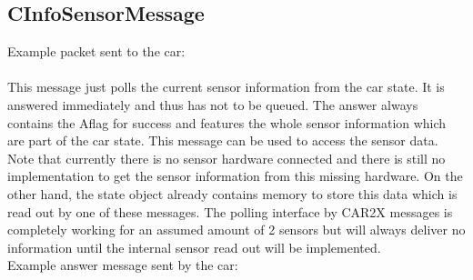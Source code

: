 \subsection*{CInfoSensorMessage}
Example packet sent to the car:\\
 \\
\newline
\newline
This message just polls the current sensor information from the car state. It is answered immediately and thus has not to be queued. The answer always contains the \glqq A\grqq flag for success and features the whole sensor information which are part of the car state. This message can be used to access the sensor data. Note that currently there is no sensor hardware connected and there is still no implementation to get the sensor information from this missing hardware. On the other hand, the state object already contains memory to store this data which is read out by one of these messages. The polling interface by CAR2X messages is completely working for an assumed amount of 2 sensors but will always deliver no information until the internal sensor read out will be implemented.\\
\newline
Example answer message sent by the car:\\
\\
\newline